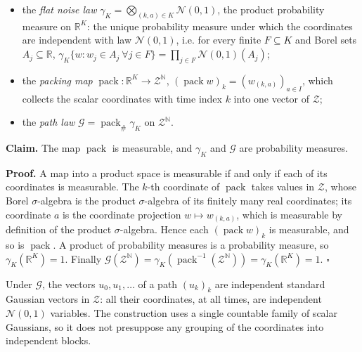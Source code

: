 \documentclass[11pt,a4paper]{article}
\begin{document}
\begin{itemize}


\item the \emph{flat noise law} \(\gamma_K=\bigotimes_{(k,a)\in K}\mathcal N(0,1)\), the product probability measure on \(\mathbb R^K\): the unique probability measure under which the coordinates are independent with law \(\mathcal N(0,1)\), i.e. for every finite \(F\subseteq K\) and Borel sets \(A_j\subseteq\mathbb R\), \(\gamma_K\{w:w_j\in A_j\ \forall j\in F\}=\prod_{j\in F}\mathcal N(0,1)(A_j)\);

\item the \emph{packing map} \(\operatorname{pack}:\mathbb R^K\to\mathcal Z^{\mathbb N}\), \((\operatorname{pack}w)_k=(w_{(k,a)})_{a\in I}\), which collects the scalar coordinates with time index \(k\) into one vector of \(\mathcal Z\);

\item the \emph{path law} \(\mathcal G=\operatorname{pack}_\#\gamma_K\) on \(\mathcal Z^{\mathbb N}\).

\end{itemize}



\textbf{Claim.} The map \(\operatorname{pack}\) is measurable, and \(\gamma_K\) and \(\mathcal G\) are probability measures.




\textbf{Proof.} A map into a product space is measurable if and only if each of its coordinates is measurable. The \(k\)-th coordinate of \(\operatorname{pack}\) takes values in \(\mathcal Z\), whose Borel \(\sigma\)-algebra is the product \(\sigma\)-algebra of its finitely many real coordinates; its coordinate \(a\) is the coordinate projection \(w\mapsto w_{(k,a)}\), which is measurable by definition of the product \(\sigma\)-algebra. Hence each \((\operatorname{pack}w)_k\) is measurable, and so is \(\operatorname{pack}\). A product of probability measures is a probability measure, so \(\gamma_K(\mathbb R^K)=1\). Finally \(\mathcal G(\mathcal Z^{\mathbb N})=\gamma_K(\operatorname{pack}^{-1}(\mathcal Z^{\mathbb N}))=\gamma_K(\mathbb R^K)=1\). \(\square\)




Under \(\mathcal G\), the vectors \(u_0,u_1,\dots\) of a path \((u_k)_k\) are independent standard Gaussian vectors in \(\mathcal Z\): all their coordinates, at all times, are independent \(\mathcal N(0,1)\) variables. The construction uses a single countable family of scalar Gaussians, so it does not presuppose any grouping of the coordinates into independent blocks.
\end{document}
